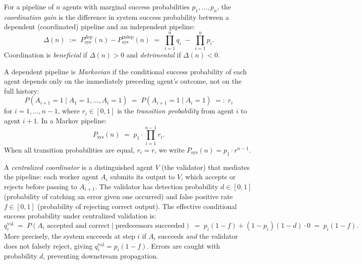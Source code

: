 \begin{definition}
\label{def:coord-gain}
For a pipeline of $n$ agents with marginal success probabilities $p_1, \ldots, p_n$,
the \emph{coordination gain} is the difference in system success probability between
a dependent (coordinated) pipeline and an independent pipeline:
\[
  \Delta(n) \;:=\; P_{\mathrm{sys}}^{\mathrm{dep}}(n) - P_{\mathrm{sys}}^{\mathrm{indep}}(n)
  \;=\; \prod_{i=1}^{n} q_i \;-\; \prod_{i=1}^{n} p_i.
\]
Coordination is \emph{beneficial} if $\Delta(n) > 0$ and \emph{detrimental} if $\Delta(n) < 0$.
\end{definition}

\begin{definition}
\label{def:markov-pipeline}
A dependent pipeline is \emph{Markovian} if the conditional success probability of each
agent depends only on the immediately preceding agent's outcome, not on the full history:
\[
  P(A_{i+1} = 1 \mid A_1 = 1, \ldots, A_i = 1) \;=\; P(A_{i+1} = 1 \mid A_i = 1) \;=:\; r_i
\]
for $i = 1, \ldots, n-1$, where $r_i \in [0,1]$ is the \emph{transition probability} from
agent $i$ to agent $i+1$. In a Markov pipeline:
\[
  P_{\mathrm{sys}}(n) \;=\; p_1 \cdot \prod_{i=1}^{n-1} r_i.
\]
When all transition probabilities are equal, $r_i = r$, we write $P_{\mathrm{sys}}(n) = p_1 \cdot r^{n-1}$.
\end{definition}

\begin{definition}
\label{def:hub-spoke}
A \emph{centralized coordinator} is a distinguished agent $V$ (the validator) that
mediates the pipeline: each worker agent $A_i$ submits its output to $V$, which
accepts or rejects before passing to $A_{i+1}$. The validator has detection probability
$d \in [0,1]$ (probability of catching an error given one occurred) and false positive
rate $f \in [0,1]$ (probability of rejecting correct output). The effective conditional
success probability under centralized validation is:
\[
  q_i^{\mathrm{val}} \;=\; P(A_i \text{ accepted and correct} \mid \text{predecessors succeeded})
  \;=\; p_i(1 - f) + (1 - p_i)(1 - d) \cdot 0 \;=\; p_i(1 - f).
\]
More precisely, the system succeeds at step $i$ if $A_i$ succeeds \emph{and} the validator
does not falsely reject, giving $q_i^{\mathrm{val}} = p_i(1-f)$. Errors are caught
with probability $d$, preventing downstream propagation.
\end{definition}

